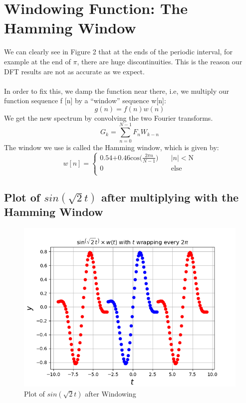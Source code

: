 \documentclass[11pt]{article}
\begin{document}
\section{Windowing Function: The Hamming Window}
We can clearly see in Figure 2 that at the ends of the periodic interval, for example at the end of $\pi$, there are huge discontinuities. This is the reason our DFT results are not as accurate as we expect.\\~\\
In order to fix this, we damp the function near there, i.e, we multiply our function sequence f [n] by a “window” sequence w[n]:
\begin{equation}
    g(n)=f(n)w(n)
\end{equation}
We get the new spectrum by convolving the two Fourier transforms.
\begin{equation}
    G_k=\sum_{n=0}^{N-1}F_nW_{k-n}
\end{equation}
The window we use is called the Hamming window, which is given by:
\[   
w[n] = 
    \begin{cases}
        \text{0.54+0.46cos($\frac{2\pi n}{N-1}$)} &\quad\text{$|n|<$N} \\ 
        \text{0} &\quad\text{else} \\ 
    \end{cases}
\]

\subsection{Plot of $sin(\sqrt{2}t)$ after multiplying with the Hamming Window}
\begin{figure}[H]
    \centering
    \includegraphics[scale = 0.75]{Figure_3.png}
    \caption{Plot of $sin(\sqrt{2}t)$ after Windowing}
\end{figure}
\end{document}
